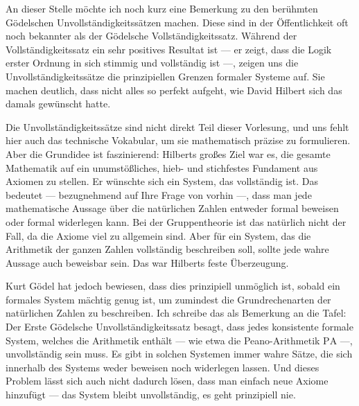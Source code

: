 \begin{spoken-clean}[00:59:17 - 01:01:38]
An dieser Stelle möchte ich noch kurz eine Bemerkung zu den berühmten Gödelschen Unvollständigkeitssätzen machen. Diese sind in der Öffentlichkeit oft noch bekannter als der Gödelsche Vollständigkeitssatz. Während der Vollständigkeitssatz ein sehr positives Resultat ist --- er zeigt, dass die Logik erster Ordnung in sich stimmig und vollständig ist ---, zeigen uns die Unvollständigkeitssätze die prinzipiellen Grenzen formaler Systeme auf. Sie machen deutlich, dass nicht alles so perfekt aufgeht, wie David Hilbert sich das damals gewünscht hatte.

Die Unvollständigkeitssätze sind nicht direkt Teil dieser Vorlesung, und uns fehlt hier auch das technische Vokabular, um sie mathematisch präzise zu formulieren. Aber die Grundidee ist faszinierend: Hilberts großes Ziel war es, die gesamte Mathematik auf ein unumstößliches, hieb- und stichfestes Fundament aus Axiomen zu stellen. Er wünschte sich ein System, das vollständig ist. Das bedeutet --- bezugnehmend auf Ihre Frage von vorhin ---, dass man jede mathematische Aussage über die natürlichen Zahlen entweder formal beweisen oder formal widerlegen kann. Bei der Gruppentheorie ist das natürlich nicht der Fall, da die Axiome viel zu allgemein sind. Aber für ein System, das die Arithmetik der ganzen Zahlen vollständig beschreiben soll, sollte jede wahre Aussage auch beweisbar sein. Das war Hilberts feste Überzeugung.

Kurt Gödel hat jedoch bewiesen, dass dies prinzipiell unmöglich ist, sobald ein formales System mächtig genug ist, um zumindest die Grundrechenarten der natürlichen Zahlen zu beschreiben. Ich schreibe das als Bemerkung an die Tafel: Der Erste Gödelsche Unvollständigkeitssatz besagt, dass jedes konsistente formale System, welches die Arithmetik enthält --- wie etwa die Peano-Arithmetik $\text{PA}$ ---, unvollständig sein muss. Es gibt in solchen Systemen immer wahre Sätze, die sich innerhalb des Systems weder beweisen noch widerlegen lassen. Und dieses Problem lässt sich auch nicht dadurch lösen, dass man einfach neue Axiome hinzufügt --- das System bleibt unvollständig, es geht prinzipiell nie.
\end{spoken-clean}

\begin{math-stroke}
\end{math-stroke}

